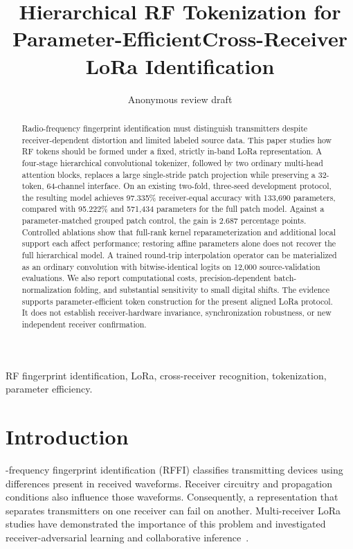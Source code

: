 \documentclass[journal]{IEEEtran}
\begin{document}
\title{Hierarchical RF Tokenization for Parameter-Efficient\newline Cross-Receiver LoRa Identification}
\author{Anonymous review draft}
\maketitle

\begin{abstract}
Radio-frequency fingerprint identification must distinguish transmitters despite receiver-dependent distortion and limited labeled source data. This paper studies how RF tokens should be formed under a fixed, strictly in-band LoRa representation. A four-stage hierarchical convolutional tokenizer, followed by two ordinary multi-head attention blocks, replaces a large single-stride patch projection while preserving a 32-token, 64-channel interface. On an existing two-fold, three-seed development protocol, the resulting model achieves 97.335\% receiver-equal accuracy with 133,690 parameters, compared with 95.222\% and 571,434 parameters for the full patch model. Against a parameter-matched grouped patch control, the gain is 2.687 percentage points. Controlled ablations show that full-rank kernel reparameterization and additional local support each affect performance; restoring affine parameters alone does not recover the full hierarchical model. A trained round-trip interpolation operator can be materialized as an ordinary convolution with bitwise-identical logits on 12,000 source-validation evaluations. We also report computational costs, precision-dependent batch-normalization folding, and substantial sensitivity to small digital shifts. The evidence supports parameter-efficient token construction for the present aligned LoRa protocol. It does not establish receiver-hardware invariance, synchronization robustness, or new independent receiver confirmation.
\end{abstract}
\begin{IEEEkeywords}
RF fingerprint identification, LoRa, cross-receiver recognition, tokenization, parameter efficiency.
\end{IEEEkeywords}

\section{Introduction}
-frequency fingerprint identification (RFFI) classifies transmitting devices using differences present in received waveforms. Receiver circuitry and propagation conditions also influence those waveforms. Consequently, a representation that separates transmitters on one receiver can fail on another. Multi-receiver LoRa studies have demonstrated the importance of this problem and investigated receiver-adversarial learning and collaborative inference~\cite{shen2024}.
\end{document}
